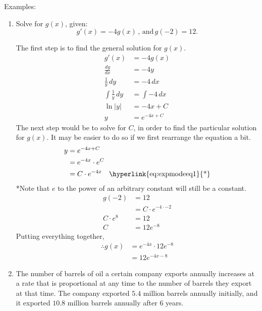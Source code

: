\documentclass[12pt]{article}
\begin{document}
            \noindent Examples:
            \begin{enumerate}
                \item Solve for $g(x)$, given:
                \[ g'(x) = -4 g(x) \, \text{, and} \, g(-2) = 12. \]

                The first step is to find the general solution for $g(x)$.
                \begin{align*}
                    g'(x) &= -4 g(x) \\
                    \frac{dy}{dx} &= -4y \\[6pt]
                    \frac{1}{y} \, dy &= -4 \, dx \\[6pt]
                    \int \frac{1}{y} \, dy &= \int -4 \, dx \\[6pt]
                    \ln|y| &= -4x + C \\
                    y &= e^{-4x + C}
                \end{align*}
                The next step would be to solve for $C$, in order to find the particular solution for $g(x)$. It may be easier to do so if we first rearrange the equation a bit.
                \begin{align*}
                    y &= e^{-4x + C} \\
                    &= e^{-4x} \cdot e^C \\
                    &= C \cdot e^{-4x} \quad \text{\hyperlink{eq:expmodeeq1}{*}}
                \end{align*}
                \hypertarget{eq:expmodeq1}{*}Note that $e$ to the power of an arbitrary constant will still be a constant.
                \begin{align*}
                    g(-2) &= 12 \\
                    &= C \cdot e^{-4 \cdot -2} \\
                    C \cdot e^8 &= 12 \\
                    C &= 12 e^{-8}
                \end{align*}
                Putting everything together,
                \begin{align*}
                    \therefore g(x) &= e^{-4x} \cdot 12 e^{-8} \\
                    &= 12 e^{-4x-8}
                \end{align*}
                \smallskip

                \item The number of barrels of oil a certain company exports annually increases at a rate that is proportional at any time to the number of barrels they export at that time. The company exported $5.4$ million barrels annually initially, and it exported $10.8$ million barrels annually after $6$ years.


\end{enumerate}
\end{document}
